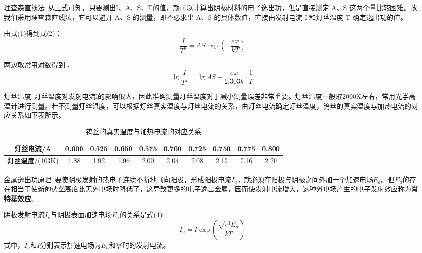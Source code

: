 \documentclass{beamer}
\begin{document}
    \begin{frame}{理查森直线法}{\thesubsection \, \subsecname}
        从上式可知，只要测出I、A、S、T的值，就可以计算出阴极材料的电子逸出功，但是直接测定 A、S 这两个量比较困难。故我们采用理查森直线法，它可以避开 A、S 的测量，即不必求出 A、S 的具体数值，直接由发射电流 I 和灯丝温度 T 确定逸出功的值。

        由式(1)得到式(2)：
        \begin{equation}
            \frac{I}{T^2} = AS\exp(-\frac{e\varphi}{kT})
        \end{equation}

        两边取常用对数得到：
        \begin{equation}
            \lg\frac{I}{T^2} = \lg AS - \frac{e\varphi}{2.303k}\cdot \frac{1}{T}
        \end{equation}
    \end{frame}

    \begin{frame}{灯丝温度}{\thesubsection \, \subsecname}
        灯丝温度对发射电流I的影响很大，因此准确测量灯丝温度对于减小测量误差非常重要。灯丝温度一般取2000K左右，常用光学高温计进行测量。若不测量灯丝温度，可以根据灯丝真实温度与灯丝电流的关系，由灯丝电流确定灯丝温度，钨丝的真实温度与加热电流的对应关系如下表所示。
        \begin{table}
            \footnotesize
            \caption{钨丝的真实温度与加热电流的对应关系}
            \centering
            \begin{tabular}{cccccccccc}
            \toprule
            \textbf{灯丝电流}/A & 0.600	& 0.625	& 0.650	& 0.675	& 0.700	& 0.725	& 0.750	& 0.775	& 0.800\\
            \midrule
            \textbf{灯丝温度}/(103K) & 1.88	& 1.92	& 1.96	& 2.00	& 2.04	& 2.08	& 2.12	& 2.16	& 2.20\\
            \bottomrule
            \end{tabular}
        \end{table}
    \end{frame}

    \begin{frame}{金属逸出功原理}{\thesubsection \, \subsecname}
        要使阴极发射的热电子连续不断地飞向阳极，形成阳极电流$I_a$，就必须在阳极与阴极之间外加一个加速电场$E_a$。但$E_a$的存在相当于使新的势垒高度比无外电场时降低了，这导致更多的电子逸出金属，因而使发射电流增大，这种外电场产生的电子发射效应称为\textbf{肖特基效应}。
        
        阴极发射电流$I_a$与阴极表面加速电场$E_a$的关系是式(4):
        \begin{equation}
            I_a = I \exp(\frac{\sqrt{e^3E_a}}{kT})
        \end{equation}
        式中，$I_a$和$I$分别表示加速电场为$E_a$和零时的发射电流。
    \end{frame}
\end{document}
